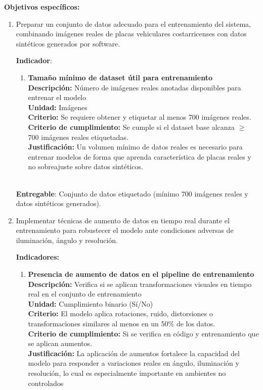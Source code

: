 \textbf{Objetivos específicos: }
\begin{enumerate}
	\item Preparar un conjunto de datos adecuado para el entrenamiento del sistema,
		combinando imágenes reales de placas vehiculares costarricenses con datos sintéticos generados por software.
		
		\textbf{Indicador}:
		\begin{enumerate}
			\item \textbf{Tamaño mínimo de dataset útil para entrenamiento}\\
			\textbf{Descripción:} Número de imágenes reales anotadas disponibles para entrenar el modelo \\
			\textbf{Unidad:} Imágenes \\
			\textbf{Criterio:} Se requiere obtener y etiquetar al menos 700 imágenes reales. \\
			\textbf{Criterio de cumplimiento:} Se cumple si el dataset base alcanza $\geq$ 700 imágenes reales etiquetadas. \\
			\textbf{Justificación:} Un volumen mínimo de datos reales es necesario para entrenar modelos
				de forma que aprenda característica de placas reales y no sobreajuste sobre datos sintéticos. \\ \\
		\end{enumerate}

		\textbf{Entregable}: Conjunto de datos etiquetado (mínimo 700 imágenes reales y datos sintéticos generados).

	\item Implementar técnicas de aumento de datos en tiempo real durante el entrenamiento para 
		robustecer el modelo ante condiciones adversas de iluminación, ángulo y resolución.

		\textbf{Indicadores:}
		\begin{enumerate}
			\item \textbf{Presencia de aumento de datos en el pipeline de entrenamiento} \\
			\textbf{Descripción:} 
			Verifica si se aplican transformaciones visuales en tiempo real en el conjunto de entrenamiento \\
			\textbf{Unidad:} Cumplimiento binario (Sí/No) \\
			\textbf{Criterio:}  El modelo aplica rotaciones, ruido, 
				distorsiones o transformaciones similares al menos en un 50\% de los datos. \\ 
			\textbf{Criterio de cumplimiento:} Si se verifica en código y entrenamiento que se aplican aumentos. \\
			\textbf{Justificación:} La aplicación de aumentos fortalece la capacidad del modelo
				para responder a variaciones reales en ángulo, iluminación y resolución,
				lo cual es especialmente importante en ambientes no controlados \\


\end{enumerate}
\end{enumerate}
